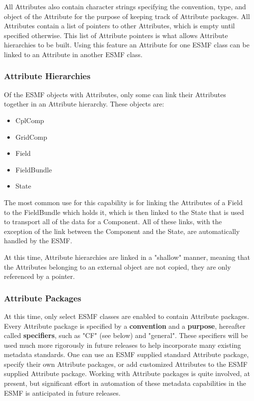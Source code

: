All Attributes also contain character strings specifying the convention, type, and object of the Attribute for the purpose of keeping track of Attribute packages.  All Attributes contain a list of pointers to other Attributes, which is empty until specified otherwise.  This list of Attribute pointers is what allows Attribute hierarchies to be built.  Using this feature an Attribute for one ESMF class can be linked to an Attribute in another ESMF class.

\subsubsection{Attribute Hierarchies}

Of the ESMF objects with Attributes, only some can link their Attributes together in an Attribute hierarchy.  These objects are:

\begin{itemize}
\item CplComp
\item GridComp
\item Field
\item FieldBundle
\item State
\end{itemize}

The most common use for this capability is for linking the Attributes of a Field to the FieldBundle which holds it, which is then linked to the State that is used to transport all of the data for a Component.  All of these links, with the exception of the link between the Component and the State, are automatically handled by the ESMF.  

At this time, Attribute hierarchies are linked in a "shallow" manner, meaning that the Attributes belonging to an external object are not copied, they are only referenced by a pointer.  

\subsubsection{Attribute Packages}

At this time, only select ESMF classes are enabled to contain Attribute packages.  Every Attribute package is specified by a {\bf convention} and a {\bf purpose}, hereafter called {\bf specifiers}, such as "CF" (see below) and "general".  These specifiers will be used much more rigorously in future releases to help incorporate many existing metadata standards.  One can use an ESMF supplied standard Attribute package, specify their own Attribute packages, or add customized Attributes to the ESMF supplied Attribute package.  Working with Attribute packages is quite involved, at present, but significant effort in automation of these metadata capabilities in the ESMF is anticipated in future releases. 

